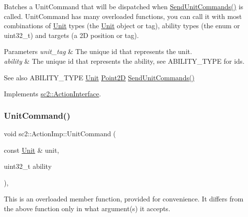 Batches a Unit\+Command that will be dispatched when \hyperlink{classsc2_1_1_action_imp_a1edc0de46368f2c2edb79aa098727fb4}{Send\+Unit\+Commands()} is called. Unit\+Command has many overloaded functions, you can call it with most combinations of \hyperlink{classsc2_1_1_unit}{Unit} types (the \hyperlink{classsc2_1_1_unit}{Unit} object or tag), ability types (the enum or uint32\+\_\+t) and targets (a 2D position or tag). 
\begin{DoxyParams}{Parameters}
{\em unit\+\_\+tag} & The unique id that represents the unit. \\
\hline
{\em ability} & The unique id that represents the ability, see A\+B\+I\+L\+I\+T\+Y\+\_\+\+T\+Y\+PE for ids. \\
\hline
\end{DoxyParams}
\begin{DoxySeeAlso}{See also}
A\+B\+I\+L\+I\+T\+Y\+\_\+\+T\+Y\+PE \hyperlink{classsc2_1_1_unit}{Unit} \hyperlink{structsc2_1_1_point2_d}{Point2D} \hyperlink{classsc2_1_1_action_imp_a1edc0de46368f2c2edb79aa098727fb4}{Send\+Unit\+Commands()} 
\end{DoxySeeAlso}


Implements \hyperlink{classsc2_1_1_action_interface_ad9d9d772cdf29253b9dda5c7e7a3d836}{sc2\+::\+Action\+Interface}.

\mbox{\label{classsc2_1_1_action_imp_a4b8557f67da3552d161d84f35e80f854}} 
\subsubsection{\texorpdfstring{Unit\+Command()}{UnitCommand()}\hspace{0.1cm}{\footnotesize\ttfamily [2/6]}}
{\footnotesize\ttfamily void sc2\+::\+Action\+Imp\+::\+Unit\+Command (\begin{DoxyParamCaption}\item[{const \hyperlink{classsc2_1_1_unit}{Unit} \&}]{unit,  }\item[{uint32\+\_\+t}]{ability }\end{DoxyParamCaption})\hspace{0.3cm}{\ttfamily [override]}, {\ttfamily [virtual]}}

This is an overloaded member function, provided for convenience. It differs from the above function only in what argument(s) it accepts. 

